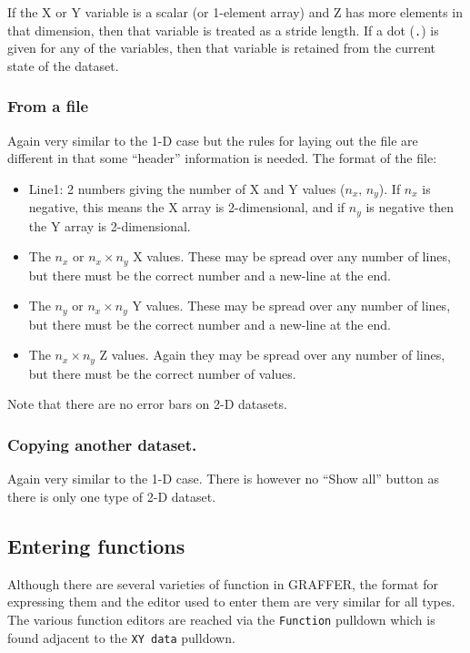 \documentclass[11pt,twoside,english]{article}
\begin{document}
If the X or Y variable is a scalar (or 1-element array) and Z has more
elements in that dimension, then that variable is treated as a stride
length. If a dot (\texttt{.}) is given for any of the variables, then
that variable is retained from the current state of the dataset.

\subsubsection{From a file}

Again very similar to the 1-D case but the rules for laying out the
file are different in that some {}``header'' information is needed.
The format of the file:

\begin{itemize}
\item Line1: 2 numbers giving the number of X and Y values ($n_{x},\,
  n_{y}$). If $n_x$ is negative, this means the X array is
  2-dimensional, and if $n_y$ is negative then the Y array is
  2-dimensional.
\item The $n_{x}$ or $n_x \times n_y$ X values. These may be spread
  over any number of lines, but there must be the correct number and a
  new-line at the end.
\item The $n_{y}$ or $n_x \times n_y$ Y values. These may be spread
  over any number of lines, but there must be the correct number and a
  new-line at the end.
\item The $n_{x}\times n_{y}$ Z values. Again they may be spread over
  any number of lines, but there must be the correct number of values.
\end{itemize}
Note that there are no error bars on 2-D datasets.

\subsubsection{Copying another dataset.}
\label{sec:zcopy}

Again very similar to the 1-D case. There is however no ``Show all''
button as there is only one type of 2-D dataset.

\subsection{Entering functions\label{enter-fun}}

Although there are several varieties of function in GRAFFER, the format
for expressing them and the editor used to enter them are very similar
for all types. The various function editors are reached via the
\texttt{Function} pulldown which is found adjacent to the \texttt{XY
  data} pulldown.
\end{document}
